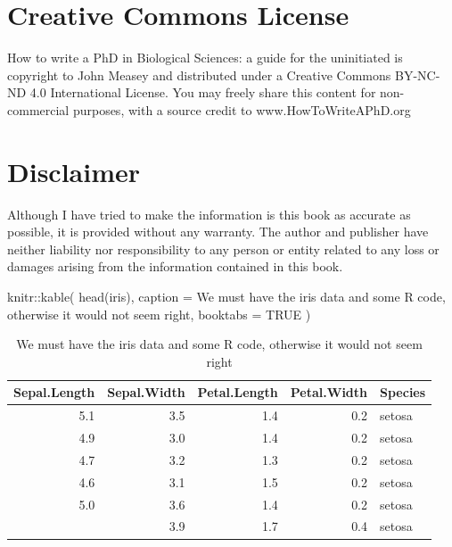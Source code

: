 \documentclass[
]{krantz}
\makeatletter
\newenvironment{Shaded}{\begin{snugshade}}{\end{snugshade}}
\newcommand{\AttributeTok}[1]{\textcolor[rgb]{0.61,0.61,0.61}{#1}}
\newcommand{\ConstantTok}[1]{\textcolor[rgb]{0,0,0}{#1}}
\newcommand{\FunctionTok}[1]{\textcolor[rgb]{0,0,0}{#1}}
\newcommand{\NormalTok}[1]{#1}
\newcommand{\SpecialCharTok}[1]{\textcolor[rgb]{0,0,0}{#1}}
\newcommand{\StringTok}[1]{\textcolor[rgb]{0.5,0.5,0.5}{#1}}
\newenvironment{kframe}{%
\medskip{}
\setlength{\fboxsep}{.8em}
 \def\at@end@of@kframe{}%
 \ifinner\ifhmode%
  \def\at@end@of@kframe{\end{minipage}}%
  \begin{minipage}{\columnwidth}%
 \fi\fi%
 \def\FrameCommand##1{\hskip\@totalleftmargin \hskip-\fboxsep
 \colorbox{shadecolor}{##1}\hskip-\fboxsep
     \hskip-\linewidth \hskip-\@totalleftmargin \hskip\columnwidth}%
 \MakeFramed {\advance\hsize-\width
   \@totalleftmargin\z@ \linewidth\hsize
   \@setminipage}}%
 {\par\unskip\endMakeFramed%
 \at@end@of@kframe}
\renewenvironment{Shaded}{\begin{kframe}}{\end{kframe}}
\makeatother
\begin{document}
\hypertarget{creative-commons-license}{%
\section*{Creative Commons License}\label{creative-commons-license}}


How to write a PhD in Biological Sciences: a guide for the uninitiated is copyright to John Measey and distributed under a Creative Commons BY-NC-ND 4.0 International License. You may freely share this content for non-commercial purposes, with a source credit to www.HowToWriteAPhD.org

\hypertarget{disclaimer}{%
\section*{Disclaimer}\label{disclaimer}}


Although I have tried to make the information is this book as accurate as possible, it is provided without any warranty. The author and publisher have neither liability nor responsibility to any person or entity related to any loss or damages arising from the information contained in this book.

\begin{Shaded}
\begin{Highlighting}[]
\NormalTok{knitr}\SpecialCharTok{::}\FunctionTok{kable}\NormalTok{(}
  \FunctionTok{head}\NormalTok{(iris), }\AttributeTok{caption =} \StringTok{\textquotesingle{}We must have the iris data and some R code, otherwise it would not seem right\textquotesingle{}}\NormalTok{,}
  \AttributeTok{booktabs =} \ConstantTok{TRUE}
\NormalTok{)}
\end{Highlighting}
\end{Shaded}

\begin{table}

\caption{\label{tab:iris}We must have the iris data and some R code, otherwise it would not seem right}
\centering
\begin{tabular}[t]{rrrrl}
\toprule
Sepal.Length & Sepal.Width & Petal.Length & Petal.Width & Species\\
\midrule
5.1 & 3.5 & 1.4 & 0.2 & setosa\\
4.9 & 3.0 & 1.4 & 0.2 & setosa\\
4.7 & 3.2 & 1.3 & 0.2 & setosa\\
4.6 & 3.1 & 1.5 & 0.2 & setosa\\
5.0 & 3.6 & 1.4 & 0.2 & setosa\\
\addlinespace
5.4 & 3.9 & 1.7 & 0.4 & setosa\\
\bottomrule
\end{tabular}
\end{table}
\end{document}

